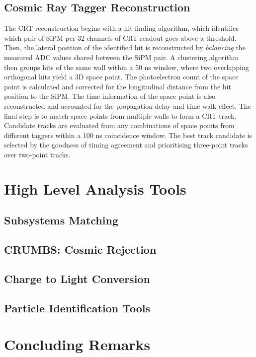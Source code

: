 
\subsection{Cosmic Ray Tagger Reconstruction}

The CRT reconstruction begins with a hit finding algorithm, which identifies which pair of SiPM per 32 channels of CRT readout goes above a threshold. 
Then, the lateral position of the identified hit is reconstructed by \textit{balancing} the measured ADC values shared between the SiPM pair.
A clustering algorithm then groups hits of the same wall within a 50 ns window, where two overlapping orthogonal hits yield a 3D space point.
The photoelectron count of the space point is calculated and corrected for the longitudinal distance from the hit position to the SiPM.
The time information of the space point is also reconstructed and accounted for the propagation delay and time walk effect.
The final step is to match space points from multiple walls to form a CRT track.
Candidate tracks are evaluated from any combinations of space points from different taggers within a 100 ns coincidence window.
The best track candidate is selected by the goodness of timing agreement and prioritising three-point tracks over two-point tracks. 

\section{High Level Analysis Tools}

\subsection{Subsystems Matching}

\subsection{CRUMBS: Cosmic Rejection}

\subsection{Charge to Light Conversion}

\subsection{Particle Identification Tools}

\section{Concluding Remarks}
